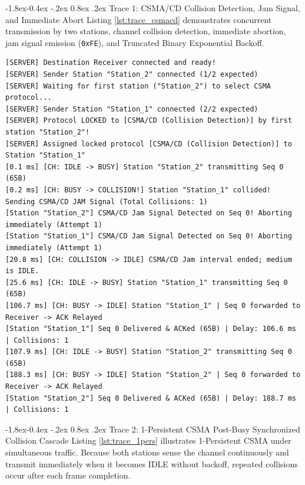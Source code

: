 \documentclass[11pt,a4paper]{article}
\makeatletter
\renewcommand\subsection{\@startsection{subsection}{2}{\z@}%
                                     {-1.8ex\@plus -0.4ex \@minus -.2ex}%
                                     {0.8ex \@plus .2ex}%
                                     {\normalfont\large\bfseries}}
\makeatother
\begin{document}
\subsection{Trace 1: CSMA/CD Collision Detection, Jam Signal, and Immediate Abort}
Listing \ref{lst:trace_csmacd} demonstrates concurrent transmission by two stations, channel collision detection, immediate abortion, jam signal emission (\texttt{0xFE}), and Truncated Binary Exponential Backoff.

\begin{lstlisting}[style=tracestyle, caption={Live socket execution transcript: CSMA/CD collision detection, jamming, and abort.}, label={lst:trace_csmacd}]
[SERVER] Destination Receiver connected and ready!
[SERVER] Sender Station "Station_2" connected (1/2 expected)
[SERVER] Waiting for first station ("Station_2") to select CSMA protocol...
[SERVER] Sender Station "Station_1" connected (2/2 expected)
[SERVER] Protocol LOCKED to [CSMA/CD (Collision Detection)] by first station "Station_2"!
[SERVER] Assigned locked protocol [CSMA/CD (Collision Detection)] to Station "Station_1"
[0.1 ms] [CH: IDLE -> BUSY] Station "Station_2" transmitting Seq 0 (65B)
[0.2 ms] [CH: BUSY -> COLLISION!] Station "Station_1" collided! Sending CSMA/CD JAM Signal (Total Collisions: 1)
[Station "Station_2"] CSMA/CD Jam Signal Detected on Seq 0! Aborting immediately (Attempt 1)
[Station "Station_1"] CSMA/CD Jam Signal Detected on Seq 0! Aborting immediately (Attempt 1)
[20.8 ms] [CH: COLLISION -> IDLE] CSMA/CD Jam interval ended; medium is IDLE.
[25.6 ms] [CH: IDLE -> BUSY] Station "Station_1" transmitting Seq 0 (65B)
[106.7 ms] [CH: BUSY -> IDLE] Station "Station_1" | Seq 0 forwarded to Receiver -> ACK Relayed
[Station "Station_1"] Seq 0 Delivered & ACKed (65B) | Delay: 106.6 ms | Collisions: 1
[107.9 ms] [CH: IDLE -> BUSY] Station "Station_2" transmitting Seq 0 (65B)
[188.3 ms] [CH: BUSY -> IDLE] Station "Station_2" | Seq 0 forwarded to Receiver -> ACK Relayed
[Station "Station_2"] Seq 0 Delivered & ACKed (65B) | Delay: 188.7 ms | Collisions: 1
\end{lstlisting}

\subsection{Trace 2: 1-Persistent CSMA Post-Busy Synchronized Collision Cascade}
Listing \ref{lst:trace_1pers} illustrates 1-Persistent CSMA under simultaneous traffic. Because both stations sense the channel continuously and transmit immediately when it becomes IDLE without backoff, repeated collisions occur after each frame completion.
\end{document}

